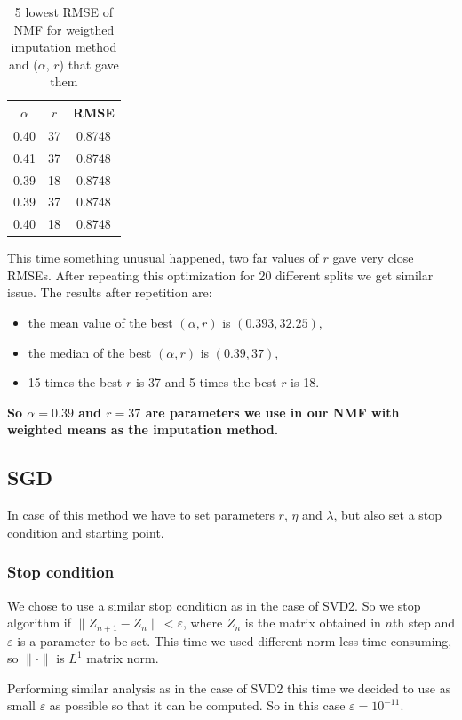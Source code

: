 \documentclass[10pt]{amsart}
\begin{document}
\begin{table}[H]
\begin{tabular}{cc|c}
$\alpha$ &  $r$ &     RMSE \\
\hline
       0.40 & 37 & 0.8748 \\
       0.41 & 37 & 0.8748 \\
       0.39 & 18 & 0.8748 \\
       0.39 & 37 & 0.8748 \\
       0.40 & 18 & 0.8748 \\
\end{tabular}
\caption{5 lowest RMSE of NMF for weigthed imputation method and ($\alpha$, $r$) that gave them}
\end{table}

This time something unusual happened, two far values of $r$ gave very close RMSEs.
After repeating this optimization for 20 different splits we get similar issue.
The results after repetition are:
\begin{itemize}
    \item the mean value of the best $(\alpha, r)$ is $(0.393, 32.25)$,
    \item the median of the best $(\alpha, r)$ is $(0.39, 37)$,
    \item 15 times the best $r$ is 37 and 5 times the best $r$ is 18.
\end{itemize}
\textbf{So $\alpha = 0.39$ and $r=37$ are parameters we use in our NMF with weighted means as the imputation method.}




\subsection*{SGD}
In case of this method we have to set parameters $r$, $\eta$ and $\lambda$, but also set a stop condition and starting point.

\subsubsection*{Stop condition}
We chose to use a similar stop condition as in the case of SVD2.
So we stop algorithm if $\|Z_{n+1} - Z_n\| < \varepsilon$, where $Z_n$ is the matrix obtained in $n$th step and $\varepsilon$ is a parameter to be set.
This time we used different norm less time-consuming, so $\| \cdot \|$ is $L^1$ matrix norm.

Performing similar analysis as in the case of SVD2 this time we decided to use as small $\varepsilon$ as possible so that it can be computed.
So in this case $\varepsilon = 10^{-11}$.
\end{document}
